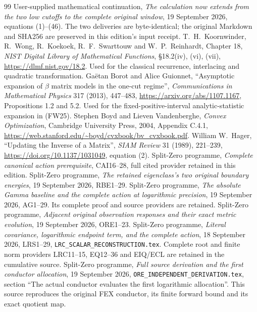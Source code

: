 \documentclass[11pt]{article}
\begin{document}
\begin{thebibliography}{99}
 User-supplied mathematical continuation,
\emph{The calculation now extends from the two low cutoffs to the complete
original window}, 19 September 2026, equations (1)--(46).
The two deliveries are byte-identical; the original Markdown and SHA256
are preserved in this edition's input receipt.
 T.~H.~Koornwinder, R.~Wong, R.~Koekoek,
R.~F.~Swarttouw and W.~P.~Reinhardt, Chapter 18,
\emph{NIST Digital Library of Mathematical Functions},
\S18.2(iv), (vi), (vii), \url{https://dlmf.nist.gov/18.2}.
Used for the classical recurrence, interlacing and quadratic transformation.
 Ga\"etan Borot and Alice Guionnet,
``Asymptotic expansion of $\beta$ matrix models in the one-cut regime'',
\emph{Communications in Mathematical Physics} 317 (2013), 447--483,
\url{https://arxiv.org/abs/1107.1167}, Propositions 1.2 and 5.2.
Used for the fixed-positive-interval analytic-statistic expansion in (FW25).
 Stephen Boyd and Lieven Vandenberghe,
\emph{Convex Optimization}, Cambridge University Press, 2004,
Appendix C.4.1, \url{https://web.stanford.edu/~boyd/cvxbook/bv_cvxbook.pdf}.
 William W.~Hager, ``Updating the Inverse of a Matrix'',
\emph{SIAM Review} 31 (1989), 221--239,
\url{https://doi.org/10.1137/1031049}, equation (2).
 Split-Zero programme, \emph{Complete canonical action
prerequisite}, CAI16--28, full cited provider retained in this edition.
 Split-Zero programme, \emph{The retained eigenclass's two
original boundary energies}, 19 September 2026, RBE1--29.
 Split-Zero programme, \emph{The absolute Gamma baseline and
the complete action at logarithmic precision}, 19 September 2026,
AG1--29. Its complete proof and source providers are retained.
 Split-Zero programme, \emph{Adjacent original observation
responses and their exact metric evolution}, 19 September 2026, ORE1--23.
 Split-Zero programme, \emph{Literal covariance, logarithmic
endpoint term, and the complete action}, 18 September 2026, LRS1--29,
\texttt{LRC\_SCALAR\_RECONSTRUCTION.tex}. Complete root and finite norm
providers LRC11--15, EQ12--36 and EIQ/ECL are retained in the cumulative source.
 Split-Zero programme, \emph{Full source derivation and the
first conductor allocation}, 19 September 2026,
\texttt{ORE\_INDEPENDENT\_DERIVATION.tex}, section ``The actual conductor
evaluates the first logarithmic allocation''. This source reproduces the
original FEX conductor, its finite forward bound and its exact quotient map.
\end{thebibliography}
\end{document}
